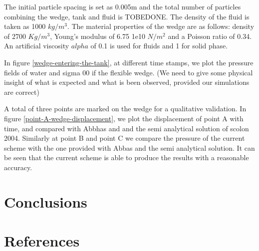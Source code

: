 \documentclass[preprint,12pt]{elsarticle}
\begin{document}
The initial particle spacing is set as 0.005m and the total number of
particles combining the wedge, tank and fluid is TOBEDONE. The density of the
fluid is taken as 1000 $kg/m^3$. The material properties of the wedge are as
follows: density of 2700 $Kg/m^3$, Young's modulus of 6.75 1e10 $N/m^2$ and a
Poisson ratio of 0.34. An artificial viscosity $alpha$ of 0.1 is used for
fluids and 1 for solid phase.

In figure \ref{wedge-entering-the-tank}, at different time stamps, we plot the
pressure fields of water and sigma 00 if the flexible wedge. (We need to give
some physical insight of what is expected and what is been observed, provided
our simulations are correct)

A total of three points are marked on the wedge for a qualitative validation.
In figure \ref{point-A-wedge-displacement}, we plot the displacement of point
A with time, and compared with Abbhas and and the semi analytical solution of
scolon 2004. Similarly at point B and point C we compare the pressure of the
current scheme with the one provided with Abbas and the semi analytical
solution. It can be seen that the current scheme is able to produce the
results with a reasonable accuracy.



\section{Conclusions}
\label{sec:conclusions}


\section*{References}





%
\end{document}

